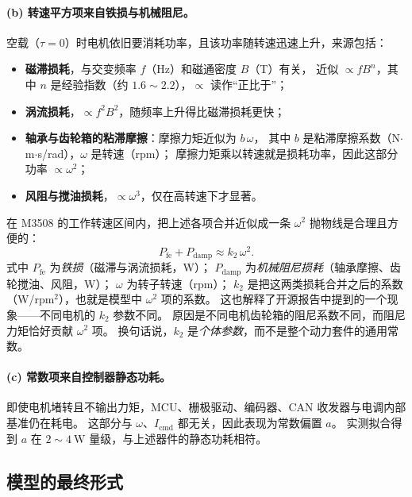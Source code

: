 \documentclass[cn,blue,11pt,device=normal]{elegantnote}
\newcommand{\Icmd}{I_{\mathrm{cmd}}{}}
\begin{document}
\paragraph{(b) 转速平方项来自铁损与机械阻尼。}
空载（$\tau = 0$）时电机依旧要消耗功率，且该功率随转速迅速上升，来源包括：
\begin{itemize}
  \item \textbf{磁滞损耗}，与交变频率 $f$（Hz）和磁通密度 $B$（T）有关，
  近似 $\propto f B^{n}$，其中 $n$ 是经验指数（约 $1.6\sim2.2$），$\propto$ 读作“正比于”；
  \item \textbf{涡流损耗}，$\propto f^2 B^2$，随频率上升得比磁滞损耗更快；
  \item \textbf{轴承与齿轮箱的粘滞摩擦}：摩擦力矩近似为 $b\,\omega$，
  其中 $b$ 是粘滞摩擦系数（N$\cdot$m$\cdot$s/rad），$\omega$ 是转速（rpm）；
  摩擦力矩乘以转速就是损耗功率，因此这部分功率 $\propto \omega^2$；
  \item \textbf{风阻与搅油损耗}，$\propto \omega^3$，仅在高转速下才显著。
\end{itemize}
在 M3508 的工作转速区间内，把上述各项合并近似成一条 $\omega^2$ 抛物线是合理且方便的：
\begin{equation}\label{eq:k2phys}
  P_{\mathrm{fe}} + P_{\mathrm{damp}} \approx k_2\,\omega^2 .
\end{equation}
式中 $P_{\mathrm{fe}}$ 为\emph{铁损}（磁滞与涡流损耗，W）；
$P_{\mathrm{damp}}$ 为\emph{机械阻尼损耗}（轴承摩擦、齿轮搅油、风阻，W）；
$\omega$ 为转子转速（rpm）；
$k_2$ 是把这两类损耗合并之后的系数（W/rpm$^2$），也就是模型中 $\omega^2$ 项的系数。
这也解释了开源报告中提到的一个现象——不同电机的 $k_2$ 参数不同。
原因是不同电机齿轮箱的阻尼系数不同，而阻尼力矩恰好贡献 $\omega^2$ 项。
换句话说，$k_2$ 是\emph{个体参数}，而不是整个动力套件的通用常数。

\paragraph{(c) 常数项来自控制器静态功耗。}
即使电机堵转且不输出力矩，MCU、栅极驱动、编码器、CAN 收发器与电调内部基准仍在耗电。
这部分与 $\omega$、$\Icmd$ 都无关，因此表现为常数偏置 $a$。
实测拟合得到 $a$ 在 $2\sim4\ \mathrm{W}$ 量级，与上述器件的静态功耗相符。

\subsection{模型的最终形式}
\end{document}

